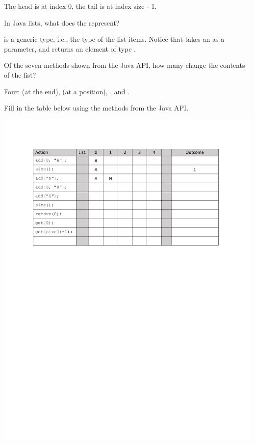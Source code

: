 \begin{answer}[3em]
The head is at index 0, the tail is at index size - 1.
\end{answer}


\Q In Java lists, what does the  represent?

\begin{answer}
 is a generic type, i.e., the type of the list items.
Notice that  takes an  as a parameter, and  returns an element of type .
\end{answer}


\Q Of the seven methods shown from the Java API, how many change the contents of the list?

\begin{answer}[3em]
Four:  (at the end),  (at a position), , and .
\end{answer}


\Q Fill in the table below using the methods from the Java API.

\vspace{-1ex}
\begin{center}
\includegraphics[width=0.85\linewidth]{figs/JavaAPIQuestionTable.pdf}
\end{center}
\vspace{-1ex}


